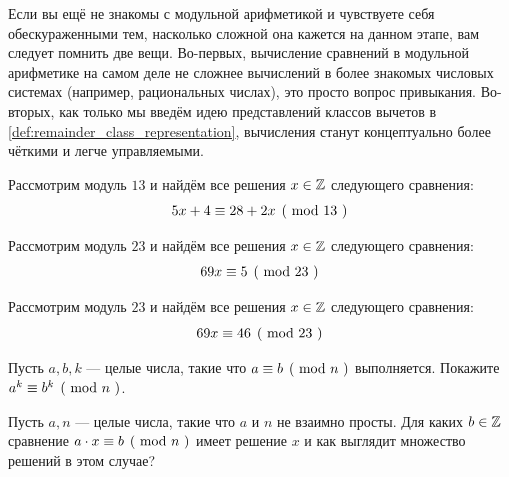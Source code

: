 Если вы ещё не знакомы с модульной арифметикой и чувствуете себя обескураженными тем, насколько сложной она кажется на данном этапе, вам следует помнить две вещи. Во-первых, вычисление сравнений в модульной арифметике на самом деле не сложнее вычислений в более знакомых числовых системах (например, рациональных числах), это просто вопрос привыкания. Во-вторых, как только мы введём идею представлений классов вычетов в \ref{def:remainder_class_representation}, вычисления станут концептуально более чёткими и легче управляемыми.
\begin{exercise}
\label{exercise_congruence_in_F13}
Рассмотрим модуль $13$ и найдём все решения $x\in \mathbb{Z}$ следующего сравнения: $$\kongru{5x+4}{28+2x}{13}$$
\end{exercise}
\begin{exercise}Рассмотрим модуль $23$ и найдём все решения $x\in \mathbb{Z}$ следующего сравнения: $$\kongru{69x}{5}{23}$$
\end{exercise}
\begin{exercise}Рассмотрим модуль $23$ и найдём все решения $x\in \mathbb{Z}$ следующего сравнения: $$\kongru{69x}{46}{23}$$
\end{exercise}
\begin{exercise}
Пусть $a,b,k$ — целые числа, такие что $\kongru{a}{b}{n}$ выполняется. Покажите $\kongru{a^k}{b^k}{n}$.
\end{exercise}
\begin{exercise}
Пусть $a,n$ — целые числа, такие что $a$ и $n$ не взаимно просты. Для каких $b\in\mathbb{Z}$ сравнение $\kongru{a\cdot x}{b}{n}$ имеет решение $x$ и как выглядит множество решений в этом случае?
\end{exercise}
